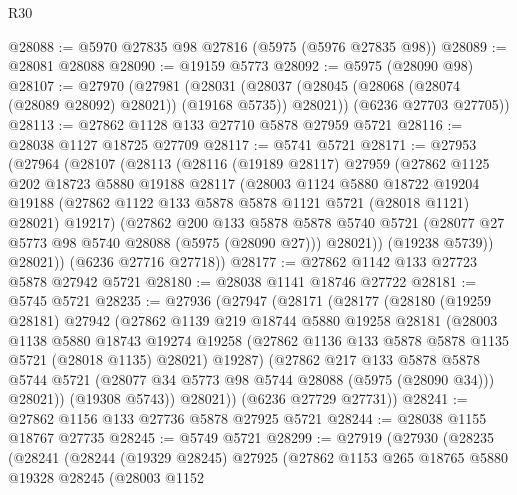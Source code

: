 \begin{lexlean}{R30}
\begin{coremodule}
@28088 := @5970 @27835 @98 @27816 (@5975 (@5976 @27835 @98))
@28089 := @28081 @28088
@28090 := @19159 @5773
@28092 := @5975 (@28090 @98)
@28107 := @27970
    (@27981
      (@28031 (@28037 (@28045 (@28068 (@28074 (@28089 @28092) @28021)) (@19168 @5735)) @28021))
      (@6236 @27703 @27705))
@28113 := @27862 @1128 @133 @27710 @5878 @27959 @5721
@28116 := @28038 @1127 @18725 @27709
@28117 := @5741 @5721
@28171 := @27953
    (@27964
      (@28107
        (@28113
          (@28116
            (@19189 @28117)
            @27959
            (@27862
              @1125
              @202
              @18723
              @5880
              @19188
              @28117
              (@28003
                @1124
                @5880
                @18722
                @19204
                @19188
                (@27862 @1122 @133 @5878 @5878 @1121 @5721 (@28018 @1121) @28021)
                @19217)
              (@27862
                @200
                @133
                @5878
                @5878
                @5740
                @5721
                (@28077 @27 @5773 @98 @5740 @28088 (@5975 (@28090 @27)))
                @28021))
            (@19238 @5739))
          @28021))
      (@6236 @27716 @27718))
@28177 := @27862 @1142 @133 @27723 @5878 @27942 @5721
@28180 := @28038 @1141 @18746 @27722
@28181 := @5745 @5721
@28235 := @27936
    (@27947
      (@28171
        (@28177
          (@28180
            (@19259 @28181)
            @27942
            (@27862
              @1139
              @219
              @18744
              @5880
              @19258
              @28181
              (@28003
                @1138
                @5880
                @18743
                @19274
                @19258
                (@27862 @1136 @133 @5878 @5878 @1135 @5721 (@28018 @1135) @28021)
                @19287)
              (@27862
                @217
                @133
                @5878
                @5878
                @5744
                @5721
                (@28077 @34 @5773 @98 @5744 @28088 (@5975 (@28090 @34)))
                @28021))
            (@19308 @5743))
          @28021))
      (@6236 @27729 @27731))
@28241 := @27862 @1156 @133 @27736 @5878 @27925 @5721
@28244 := @28038 @1155 @18767 @27735
@28245 := @5749 @5721
@28299 := @27919
    (@27930
      (@28235
        (@28241
          (@28244
            (@19329 @28245)
            @27925
            (@27862
              @1153
              @265
              @18765
              @5880
              @19328
              @28245
              (@28003
                @1152

\end{coremodule}
\end{lexlean}
